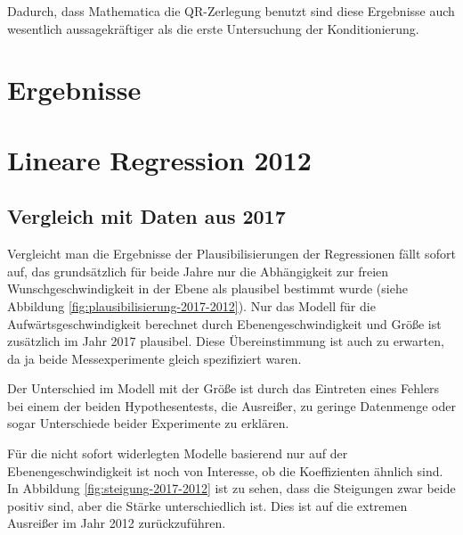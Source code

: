Dadurch, dass Mathematica die QR-Zerlegung benutzt sind diese Ergebnisse auch wesentlich aussagekräftiger als die erste Untersuchung der Konditionierung.

\section{Ergebnisse}

\section{Lineare Regression 2012}


\subsection{Vergleich mit Daten aus 2017}

Vergleicht man die Ergebnisse der Plausibilisierungen der Regressionen fällt sofort auf, das grundsätzlich für beide Jahre nur die Abhängigkeit zur freien Wunschgeschwindigkeit in der Ebene als plausibel bestimmt wurde (siehe Abbildung \ref{fig:plausibilisierung-2017-2012}). Nur das Modell für die Aufwärtsgeschwindigkeit berechnet durch Ebenengeschwindigkeit und Größe ist zusätzlich im Jahr 2017 plausibel. Diese Übereinstimmung ist auch zu erwarten, da ja beide Messexperimente gleich spezifiziert waren.

Der Unterschied im Modell mit der Größe ist durch das Eintreten eines Fehlers bei einem der beiden Hypothesentests, die Ausreißer, zu geringe Datenmenge oder sogar Unterschiede beider Experimente zu erklären.

Für die nicht sofort widerlegten Modelle basierend nur auf der Ebenengeschwindigkeit ist noch von Interesse, ob die Koeffizienten ähnlich sind. In Abbildung \ref{fig:steigung-2017-2012} ist zu sehen, dass die Steigungen zwar beide positiv sind, aber die 
Stärke unterschiedlich ist. Dies ist auf die extremen Ausreißer im Jahr 2012 zurückzuführen.


